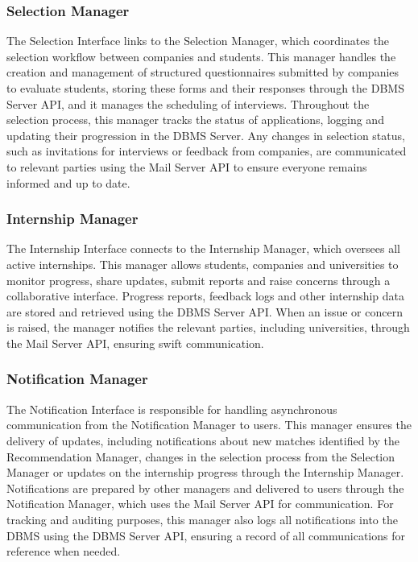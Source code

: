 \subsubsection{Selection Manager}
The Selection Interface links to the Selection Manager, which coordinates the selection workflow between companies and students.
This manager handles the creation and management of structured questionnaires submitted by companies to evaluate students, storing these forms and their responses through the DBMS Server API, and it manages the scheduling of interviews.
Throughout the selection process, this manager tracks the status of applications, logging and updating their progression in the DBMS Server.
Any changes in selection status, such as invitations for interviews or feedback from companies, are communicated to relevant parties using the Mail Server API to ensure everyone remains informed and up to date.

\subsubsection{Internship Manager}
The Internship Interface connects to the Internship Manager, which oversees all active internships.
This manager allows students, companies and universities to monitor progress, share updates, submit reports and raise concerns through a collaborative interface.
Progress reports, feedback logs and other internship data are stored and retrieved using the DBMS Server API.
When an issue or concern is raised, the manager notifies the relevant parties, including universities, through the Mail Server API, ensuring swift communication.

\subsubsection{Notification Manager}
The Notification Interface is responsible for handling asynchronous communication from the Notification Manager to users.
This manager ensures the delivery of updates, including notifications about new matches identified by the Recommendation Manager, changes in the selection process from the Selection Manager or updates on the internship progress through the Internship Manager.
Notifications are prepared by other managers and delivered to users through the Notification Manager, which uses the Mail Server API for communication.
For tracking and auditing purposes, this manager also logs all notifications into the DBMS using the DBMS Server API, ensuring a record of all communications for reference when needed.

